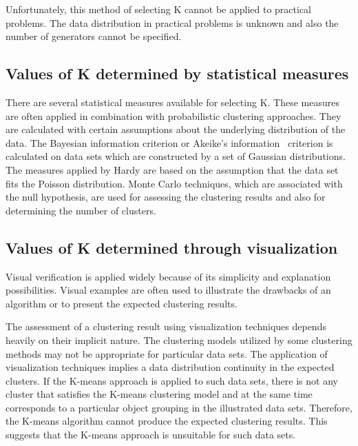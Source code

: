 Unfortunately,  this  method  of  selecting K cannot
be  applied  to  practical  problems.  The  data  distribution
in  practical  problems  is  unknown  and  also
the number of generators cannot be specified.

\subsection{Values of K determined by statistical measures}
There  are  several  statistical  measures  available  for
selecting K. These measures are often applied in combination
with   probabilistic   clustering   approaches.
They are calculated with certain assumptions
about  the  underlying  distribution  of  the  data.  The
Bayesian   information   criterion   or   Akeike’s   information~\cite{ishioka00}
criterion  is  calculated  on  data  sets
which  are  constructed  by  a  set  of  Gaussian  distributions.
The  measures  applied  by  Hardy  are
based  on  the  assumption  that  the  data  set  fits  the
Poisson distribution. Monte Carlo techniques,
which  are  associated  with  the null  hypothesis,  are
used for assessing the clustering results and also for
determining the number of clusters.

\subsection{Values of K determined through visualization}
Visual  verification  is  applied  widely  because  of  its
simplicity and explanation possibilities. Visual
examples  are  often  used  to  illustrate  the  drawbacks
of an algorithm or to present the expected clustering
results.~\cite{bilmes97}

The    assessment    of    a    clustering    result    using
visualization  techniques  depends  heavily  on  their
implicit  nature.  The  clustering  models  utilized  by
some  clustering  methods  may  not  be  appropriate
for   particular   data   sets. The  application  of
visualization  techniques  implies  a  data  distribution
continuity  in  the  expected  clusters.  If  the K-means
approach  is  applied  to  such  data  sets,  there  is  not
any    cluster    that    satisfies   the K-means   clustering
model  and  at  the  same  time  corresponds  to  a
particular   object   grouping   in   the   illustrated   data
sets.  Therefore,  the K-means  algorithm  cannot  produce
the  expected  clustering  results.  This  suggests
that  the K-means  approach  is  unsuitable  for  such
data sets.

